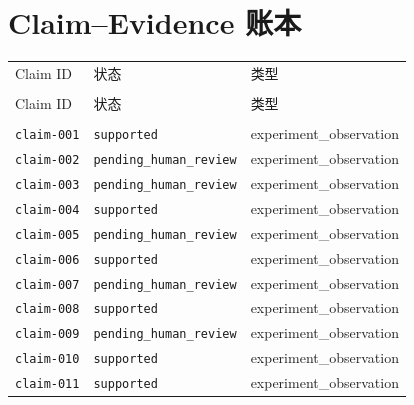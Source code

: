 \documentclass[UTF8]{ctexart}
\begin{document}
\section{Claim--Evidence 账本}
\begin{longtable}{@{}>{\raggedright\arraybackslash}p{}>{\raggedright\arraybackslash}p{}>{\raggedright\arraybackslash}p{}@{}}
\toprule
Claim ID & 状态 & 类型\\\\
\midrule
\endfirsthead
\toprule
Claim ID & 状态 & 类型\\\\
\midrule
\endhead
\texttt{\scriptsize claim-\allowbreak{}001} & \texttt{\scriptsize supported} & experiment\_\allowbreak{}observation \\
\texttt{\scriptsize claim-\allowbreak{}002} & \texttt{\scriptsize pending\_\allowbreak{}human\_\allowbreak{}review} & experiment\_\allowbreak{}observation \\
\texttt{\scriptsize claim-\allowbreak{}003} & \texttt{\scriptsize pending\_\allowbreak{}human\_\allowbreak{}review} & experiment\_\allowbreak{}observation \\
\texttt{\scriptsize claim-\allowbreak{}004} & \texttt{\scriptsize supported} & experiment\_\allowbreak{}observation \\
\texttt{\scriptsize claim-\allowbreak{}005} & \texttt{\scriptsize pending\_\allowbreak{}human\_\allowbreak{}review} & experiment\_\allowbreak{}observation \\
\texttt{\scriptsize claim-\allowbreak{}006} & \texttt{\scriptsize supported} & experiment\_\allowbreak{}observation \\
\texttt{\scriptsize claim-\allowbreak{}007} & \texttt{\scriptsize pending\_\allowbreak{}human\_\allowbreak{}review} & experiment\_\allowbreak{}observation \\
\texttt{\scriptsize claim-\allowbreak{}008} & \texttt{\scriptsize supported} & experiment\_\allowbreak{}observation \\
\texttt{\scriptsize claim-\allowbreak{}009} & \texttt{\scriptsize pending\_\allowbreak{}human\_\allowbreak{}review} & experiment\_\allowbreak{}observation \\
\texttt{\scriptsize claim-\allowbreak{}010} & \texttt{\scriptsize supported} & experiment\_\allowbreak{}observation \\
\texttt{\scriptsize claim-\allowbreak{}011} & \texttt{\scriptsize supported} & experiment\_\allowbreak{}observation \\

\end{longtable}
\end{document}
